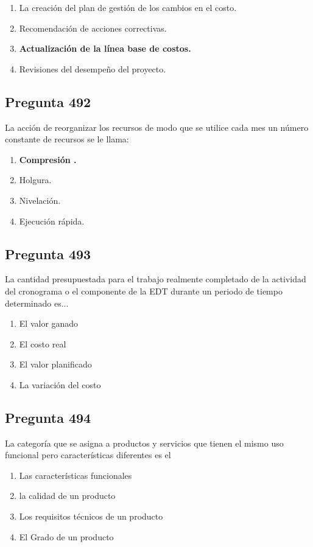\documentclass[11pt,a4paper]{article}
\begin{document}
\begin{enumerate}[label=\alph*)]
  \item La creación del plan de gestión de los cambios en el costo.
  \item Recomendación de acciones correctivas.
  \item \textbf{Actualización de la línea base de costos.}
  \item Revisiones del desempeño del proyecto.
\end{enumerate}

\subsection*{Pregunta 492}
La acción de reorganizar los recursos de modo que se utilice cada mes un número constante de recursos se le llama:

\begin{enumerate}[label=\alph*)]
  \item \textbf{Compresión .}
  \item Holgura.
  \item Nivelación.
  \item Ejecución rápida.
\end{enumerate}

\subsection*{Pregunta 493}
La cantidad presupuestada para el trabajo realmente completado de la actividad del cronograma o el componente de la EDT durante un periodo de tiempo determinado es...

\begin{enumerate}[label=\alph*)]
  \item El valor ganado
  \item El costo real
  \item El valor planificado
  \item La variación del costo
\end{enumerate}

\subsection*{Pregunta 494}
La categoría que se asigna a productos y servicios que tienen el mismo uso funcional pero características diferentes es el

\begin{enumerate}[label=\alph*)]
  \item Las características funcionales
  \item la calidad de un producto
  \item Los requisitos técnicos de un producto
  \item El Grado de un producto
\end{enumerate}
\end{document}
